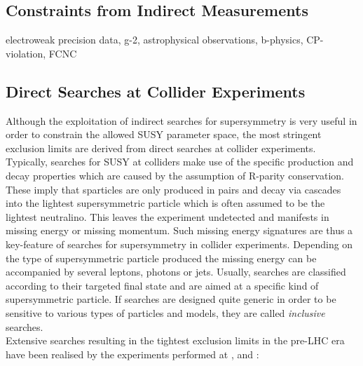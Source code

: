 \subsection{Constraints from Indirect Measurements}
\label{subsec:susy_indirect}
electroweak precision data, g-2, astrophysical observations, b-physics, CP-violation, FCNC

\subsection{Direct Searches at Collider Experiments}
\label{subsec:susy_collider}
Although the exploitation of indirect searches for supersymmetry is very useful in order to constrain the allowed SUSY parameter space, the most stringent exclusion limits are derived from direct searches at collider experiments. Typically, searches for SUSY at colliders make use of the specific production and decay properties which are caused by the assumption of R-parity conservation. These imply that sparticles are only produced in pairs and decay via cascades into the lightest supersymmetric particle which is often assumed to be the lightest neutralino. This leaves the experiment undetected and manifests in missing energy or missing momentum. Such missing energy signatures are thus a key-feature of searches for supersymmetry in collider experiments. Depending on the type of supersymmetric particle produced the missing energy can be accompanied by several leptons, photons or jets. Usually, searches are classified according to their targeted final state and are aimed at a specific kind of supersymmetric particle. If searches are designed quite generic in order to be sensitive to various types of particles and models, they are called \textit{inclusive} searches. \\  
Extensive searches resulting in the tightest exclusion limits in the pre-LHC era have been realised by the experiments performed at \hera, \lep and \tevatron:
